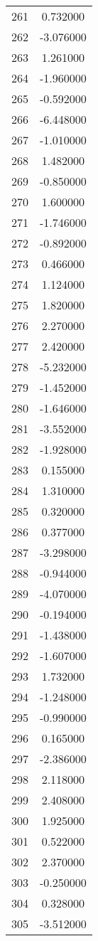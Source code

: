 \documentclass[12pt]{article}
\begin{document}
\begin{longtable}{@{}cc@{}}
261 & 0.732000 \\
262 & -3.076000 \\
263 & 1.261000 \\
264 & -1.960000 \\
265 & -0.592000 \\
266 & -6.448000 \\
267 & -1.010000 \\
268 & 1.482000 \\
269 & -0.850000 \\
270 & 1.600000 \\
271 & -1.746000 \\
272 & -0.892000 \\
273 & 0.466000 \\
274 & 1.124000 \\
275 & 1.820000 \\
276 & 2.270000 \\
277 & 2.420000 \\
278 & -5.232000 \\
279 & -1.452000 \\
280 & -1.646000 \\
281 & -3.552000 \\
282 & -1.928000 \\
283 & 0.155000 \\
284 & 1.310000 \\
285 & 0.320000 \\
286 & 0.377000 \\
287 & -3.298000 \\
288 & -0.944000 \\
289 & -4.070000 \\
290 & -0.194000 \\
291 & -1.438000 \\
292 & -1.607000 \\
293 & 1.732000 \\
294 & -1.248000 \\
295 & -0.990000 \\
296 & 0.165000 \\
297 & -2.386000 \\
298 & 2.118000 \\
299 & 2.408000 \\
300 & 1.925000 \\
301 & 0.522000 \\
302 & 2.370000 \\
303 & -0.250000 \\
304 & 0.328000 \\
305 & -3.512000 \\

\end{longtable}
\end{document}
